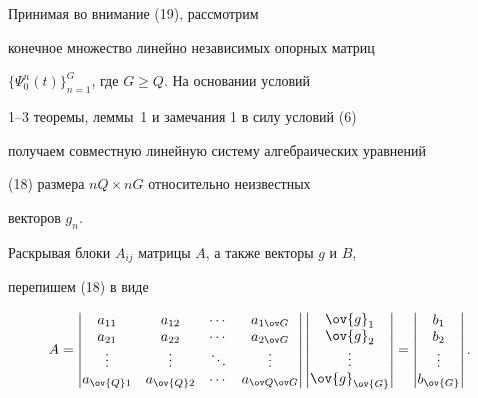 \begin{pf}


Принимая во внимание (19), рассмотрим


конечное множество линейно независимых опорных матриц


$\{\Psi^n_0(t)\}_{n=1}^G$, где $G\geq Q$. На основании условий


1--3 теоремы, леммы~1 и замечания 1 в силу условий (6)


получаем совместную линейную систему алгебраических уравнений


(18) размера $nQ\times nG$ относительно неизвестных


векторов $g_n$.





Раскрывая блоки $A_{ij}$ матрицы $A$, а также векторы $g$ и $B$,


перепишем (18) в виде


$$


A=


\begin{vmatrix}


a_{11}  & a_{12} & \dotsb & a_{1\ov G}  \\


a_{21}  & a_{22} & \dotsb & a_{2\ov G}  \\


\vdots  & \vdots & \ddots & \vdots   \\


a_{\ov{Q}1}& a_{\ov{Q}2} & \dotsb & a_{\ov Q\ov G} 


\end{vmatrix}


\begin{vmatrix}


\ov{g}_1 \\ \ov{g}_2 \\ \vdots \\ \ov{g}_{\ov{G}} 


\end{vmatrix}


=


\begin{vmatrix}


b_1 \\ b_2 \\ \vdots \\ b_{\ov{G}} 


\end{vmatrix}.


$$



\end{pf}
